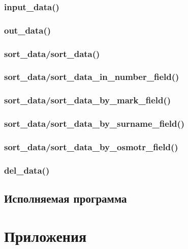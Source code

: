 \documentclass[12pt, a4paper]{article}
\begin{document}
\subsubsection{input\_data()}



\subsubsection{out\_data()}



\subsubsection{sort\_data/sort\_data()}



\subsubsection{sort\_data/sort\_data\_in\_number\_field()}



\subsubsection{sort\_data/sort\_data\_by\_mark\_field()}



\subsubsection{sort\_data/sort\_data\_by\_surname\_field()}



\subsubsection{sort\_data/sort\_data\_by\_osmotr\_field()}



\subsubsection{del\_data()}




\subsection{Исполняемая программа}

\labconclusion{}

\newpage

\section{Приложения}
\end{document}
